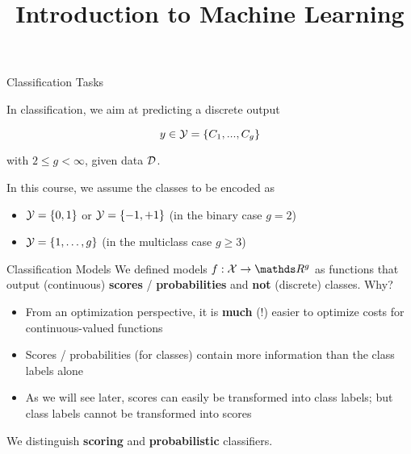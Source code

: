 \documentclass[11pt,compress,t,notes=noshow, xcolor=table]{beamer}
\title{Introduction to Machine Learning}
\begin{document}


\begin{vbframe}{Classification Tasks}

In classification, we aim at predicting a discrete output 

$$
y \in \mathcal{Y} = \{C_1, ..., C_g\}
$$

with $2 \le g < \infty$, given data $\mathcal{D}$.  

\lz 

In this course, we assume the classes to be encoded as

\begin{itemize}
  \item $\mathcal{Y} = \{0, 1\}$ or $\mathcal{Y} = \{-1, +1\}$ (in the binary case $g = 2$)
  \item $\mathcal{Y} = \{1, \ldots, g\}$  (in the multiclass case $g \ge 3$)
\end{itemize}

\vfill


\end{vbframe}


\begin{vbframe}{Classification Models} 
We defined models $f: \Xspace \to \R^g$ as functions that output (continuous) \textbf{scores} / \textbf{probabilities} and \textbf{not} (discrete) classes. Why? 

\begin{itemize}
  \item From an optimization perspective, it is \textbf{much} (!) easier to optimize costs for continuous-valued functions 
  \item Scores / probabilities (for classes) contain more information than the class labels alone
  \item As we will see later, scores can easily be transformed into class labels; but class labels cannot be transformed into scores
\end{itemize}

We distinguish \textbf{scoring} and \textbf{probabilistic} classifiers.
\end{vbframe}
\end{document}

